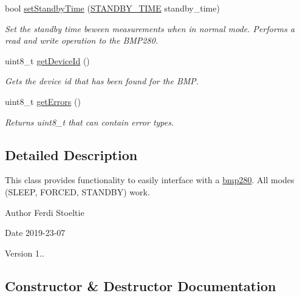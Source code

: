 \begin{DoxyCompactItemize}
bool \mbox{\hyperlink{classbmp280_a9a04623f32e2b3e8e175762e8863c41e}{set\+Standby\+Time}} (\mbox{\hyperlink{bmp280_8hpp_a2db4a9862b3a2e31301ac185385d2520}{S\+T\+A\+N\+D\+B\+Y\+\_\+\+T\+I\+ME}} standby\+\_\+time)
\begin{DoxyCompactList}\small\item\em Set the standby time beween measurements when in normal mode. Performs a read and write operation to the B\+M\+P280. \end{DoxyCompactList}\item 
uint8\+\_\+t \mbox{\hyperlink{classbmp280_ace425e5f5d6fa925613421a75dd54fef}{get\+Device\+Id}} ()
\begin{DoxyCompactList}\small\item\em Gets the device id that has been found for the B\+MP. \end{DoxyCompactList}\item 
uint8\+\_\+t \mbox{\hyperlink{classbmp280_ab463411af32432506c42768cdf73f5f2}{get\+Errors}} ()
\begin{DoxyCompactList}\small\item\em Returns uint8\+\_\+t that can contain error types. \end{DoxyCompactList}\end{DoxyCompactItemize}


\subsection{Detailed Description}
This class provides functionality to easily interface with a \mbox{\hyperlink{classbmp280}{bmp280}}. All modes (S\+L\+E\+EP, F\+O\+R\+C\+ED, S\+T\+A\+N\+D\+BY) work. 

\begin{DoxyAuthor}{Author}
Ferdi Stoeltie 
\end{DoxyAuthor}
\begin{DoxyDate}{Date}
2019-\/23-\/07 
\end{DoxyDate}
\begin{DoxyVersion}{Version}
1.. 
\end{DoxyVersion}


\subsection{Constructor \& Destructor Documentation}
\mbox{\label{classbmp280_a36d36891ce38ec1d077e8c825ff99d89}} 
